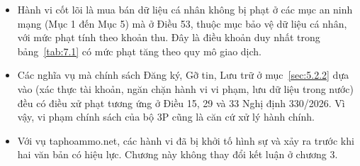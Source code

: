 \begin{itemize}
\item Hành vi cốt lõi là mua bán dữ liệu cá nhân không bị phạt ở các mục an ninh mạng (Mục 1 đến Mục 5) mà ở Điều 53, thuộc mục bảo vệ dữ liệu cá nhân, với mức phạt tính theo khoản thu. Đây là điều khoản duy nhất trong bảng~\ref{tab:7.1} có mức phạt tăng theo quy mô giao dịch.
\item Các nghĩa vụ mà chính sách Đăng ký, Gỡ tin, Lưu trữ ở mục~\ref{sec:5.2.2} dựa vào (xác thực tài khoản, ngăn chặn hành vi vi phạm, lưu dữ liệu trong nước) đều có điều xử phạt tương ứng ở Điều 15, 29 và 33 Nghị định 330/2026. Vì vậy, vi phạm chính sách của bộ 3P cũng là căn cứ xử lý hành chính.
\item Với vụ taphoammo.net, các hành vi đã bị khởi tố hình sự và xảy ra trước khi hai văn bản có hiệu lực. Chương này không thay đổi kết luận ở chương 3.
\end{itemize}
